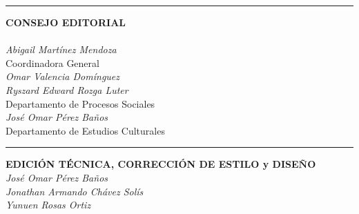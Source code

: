 \begin{center}
        \vspace{0.2cm}
        \rule{0.6\textwidth}{0.4pt}
        \vspace{0.2cm}
  
        {\montserrat\large\textbf{CONSEJO EDITORIAL}} \\
        {\montserrat{}} \\
        \vspace{0.3cm}
        \textit{Abigail Martínez Mendoza} \\
        Coordinadora General \\
        \vspace{0.2cm}
        \textit{Omar Valencia Domínguez} \\
        \textit{Ryszard Edward Rozga Luter} \\
        Departamento de Procesos Sociales \\
        \vspace{0.2cm}
        \textit{José Omar Pérez Baños} \\
        Departamento de Estudios Culturales \\
        
        \vspace{0.2cm}
        \rule{0.6\textwidth}{0.4pt}
        \vspace{0.2cm}
        
        {\montserrat\large\textbf{EDICIÓN TÉCNICA, CORRECCIÓN DE ESTILO y DISEÑO}} \\
        \vspace{0.2cm}
        \textit{José Omar Pérez Baños}\\
        \textit{Jonathan Armando Chávez Solís}\\
        \textit{Yunuen Rosas Ortiz}
      \end{center}
  \endgroup
\clearpage

